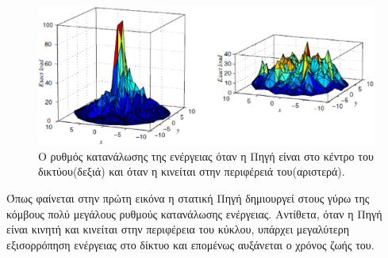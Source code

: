 \begin{figure}[h]
	\centering
	\includegraphics[width=\textwidth]{images/jointmobility_dissipation.eps}
	\caption{Ο ρυθμός κατανάλωσης της ενέργειας όταν η Πηγή είναι στο κέντρο του δικτύου(δεξιά) και όταν η κινείται στην περιφέρειά του(αριστερά).}
	\label{fig:jointmobility_dissipation}
\end{figure}

Όπως φαίνεται στην πρώτη εικόνα η στατική Πηγή δημιουργεί στους γύρω της κόμβους πολύ μεγάλους ρυθμούς κατανάλωσης ενέργειας. Αντίθετα, όταν η Πηγή είναι κινητή και
κινείται στην περιφέρεια του κύκλου, υπάρχει μεγαλύτερη εξισορρόπηση ενέργειας στο δίκτυο και επομένως αυξάνεται ο χρόνος ζωής του.

